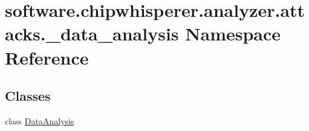 \hypertarget{namespacesoftware_1_1chipwhisperer_1_1analyzer_1_1attacks_1_1__data__analysis}{}\section{software.\+chipwhisperer.\+analyzer.\+attacks.\+\_\+data\+\_\+analysis Namespace Reference}
\label{namespacesoftware_1_1chipwhisperer_1_1analyzer_1_1attacks_1_1__data__analysis}
\subsection*{Classes}
\begin{DoxyCompactItemize}
\item 
class \hyperlink{classsoftware_1_1chipwhisperer_1_1analyzer_1_1attacks_1_1__data__analysis_1_1DataAnalysis}{Data\+Analysis}
\end{DoxyCompactItemize}
